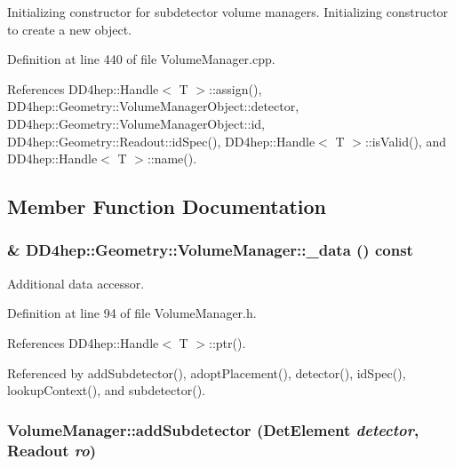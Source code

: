 Initializing constructor for subdetector volume managers. Initializing constructor to create a new object. 

Definition at line 440 of file VolumeManager.cpp.

References DD4hep::Handle$<$ T $>$::assign(), DD4hep::Geometry::VolumeManagerObject::detector, DD4hep::Geometry::VolumeManagerObject::id, DD4hep::Geometry::Readout::idSpec(), DD4hep::Handle$<$ T $>$::isValid(), and DD4hep::Handle$<$ T $>$::name().

\subsection{Member Function Documentation}
\hypertarget{class_d_d4hep_1_1_geometry_1_1_volume_manager_ae450087aa8e00fdd9829e84c3638a4e7}{
\subsubsection[{\_\-data}]{\& DD4hep::Geometry::VolumeManager::\_\-data () const}}
\label{class_d_d4hep_1_1_geometry_1_1_volume_manager_ae450087aa8e00fdd9829e84c3638a4e7}


Additional data accessor. 

Definition at line 94 of file VolumeManager.h.

References DD4hep::Handle$<$ T $>$::ptr().

Referenced by addSubdetector(), adoptPlacement(), detector(), idSpec(), lookupContext(), and subdetector().\hypertarget{class_d_d4hep_1_1_geometry_1_1_volume_manager_a6a9318986cf6574d07eaa86ea4da5085}{
\subsubsection[{addSubdetector}]{ VolumeManager::addSubdetector ({\bf DetElement} {\em detector}, \/  {\bf Readout} {\em ro})}}
\label{class_d_d4hep_1_1_geometry_1_1_volume_manager_a6a9318986cf6574d07eaa86ea4da5085}


